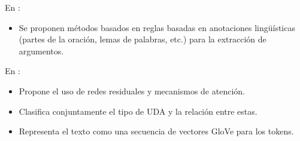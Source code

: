 \documentclass[a4paper,11pt,twocolumn,twoside]{article}
\begin{document}

En \cite{dykes2020reconstructing}:

\begin{itemize}
	\item Se proponen métodos basados en reglas basadas en anotaciones lingüísticas (partes de la oración, lemas de palabras, etc.) 
	para la extracción de argumentos. 
\end{itemize}


En \cite{galassi2021deep}:

\begin{itemize}
	\item Propone el uso de redes residuales y mecanismos de atención.
	\item Clasifica conjuntamente el tipo de UDA y la relación entre estas.
	\item Representa el texto como una secuencia de vectores GloVe para los tokens.
\end{itemize}
\end{document}

